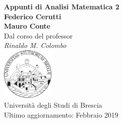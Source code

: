 \documentclass[a4paper,twoside,italian]{book}
\theoremstyle{break}
\theoremstyle{note}
\begin{document}
\author{Mauro Conte, Federico Cerutti}
\title{}
\date{Febbraio 2019}

\frontmatter
\begin{titlepage}
  \begin{center}
    {\huge\bfseries Appunti di Analisi Matematica 2\\}
    \vspace{1.5cm}
    {\Large\bfseries Federico Cerutti\\Mauro Conte\\}
    \vspace{2cm}
    {Dal corso del professor}\\[5pt]
    \emph{{Rinaldo M. Colombo}}\\[2cm]
    \vfill
    \includegraphics[width=0.19\textwidth]{unibs-logo.png}\\[5pt]
    {Università degli Studi di Brescia}\\[10pt]
    {Ultimo aggiornamento: Febbraio 2019}
  \end{center}
\end{titlepage}

\tableofcontents


\mainmatter








\backmatter
\end{document}
